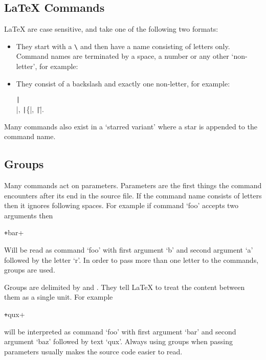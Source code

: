 \subsection{\LaTeX{} Commands}

\LaTeX{}  are case sensitive, and take one of the following
two formats:

\begin{itemize}
  \item They start with a  \verb|\| and then have a name
        consisting of letters only. Command names are terminated by a space, a
        number or any other \enquote*{non-letter}, for example:
  \item They consist of a backslash and exactly one non-letter, for example:
        \begin{chktexignore}
          \texttt|\\|, \texttt|\{|, \texttt|\"|.
        \end{chktexignore}
\end{itemize}
Many commands also exist in a `starred variant' where a star is appended to the
command name.

\subsection{Groups}

Many commands act on parameters. Parameters are the first things the command
encounters after its end in the source file. If the command name consists of
letters then it ignores following spaces. For example if command \enquote*{foo}
accepts two arguments then
\begin{code}
  \texttt+\foo bar+
\end{code}
Will be read as command \enquote*{foo} with first argument \enquote*{b} and
second argument \enquote*{a} followed by the letter \enquote*{r}. In order to pass
more than one letter to the commands, groups are used.

Groups are delimited by \ai{\{} and \ai{\}}. They tell \LaTeX{} to treat the
content between them as a single unit. For example
\begin{code}
  \texttt+qux+
\end{code}
will be interpreted as command \enquote*{foo} with first argument
\enquote*{bar} and second argument \enquote*{baz} followed by text
\enquote*{qux}. Always using groups when passing parameters usually makes the
source code easier to read.

